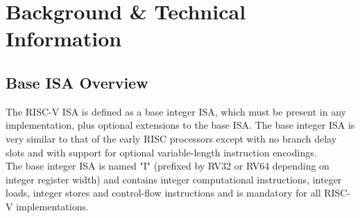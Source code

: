 
%



\chapter{Background \& Technical Information}
	\minitoc
	\section{Base ISA Overview}
	\label{sec:Overview}
	The RISC-V ISA is defined as a base integer ISA, which must be present in any implementation, plus optional extensions to the base ISA. The base integer ISA is very similar to that of the early RISC processors except with no branch delay slots and with support for optional variable-length instruction encodings. \\
	
	The base integer ISA is named "I" (prefixed by RV32 or RV64 depending on integer register width) and contains integer computational instructions, integer loads, integer stores and control-flow instructions and is mandatory for all RISC-V implementations.
	\clearpage
